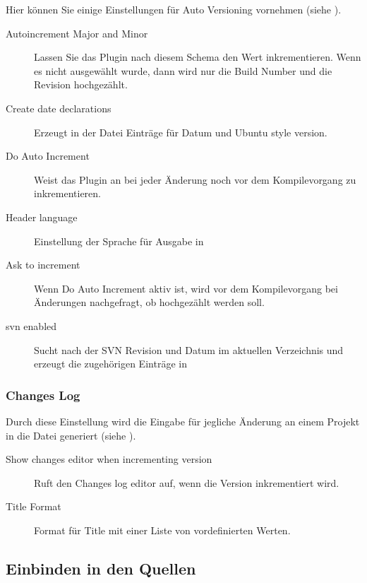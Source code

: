 Hier können Sie einige Einstellungen für Auto Versioning vornehmen (siehe ).


\begin{description}
\item[Autoincrement Major and Minor] Lassen Sie das Plugin nach diesem Schema den Wert inkrementieren. Wenn es nicht ausgewählt wurde, dann wird nur die Build Number und die Revision hochgezählt.
\item[Create date declarations] Erzeugt in der Datei  Einträge für Datum und Ubuntu style version.
\item[Do Auto Increment] Weist das Plugin an bei jeder Änderung noch vor dem Kompilevorgang zu inkrementieren.
\item[Header language] Einstellung der Sprache für Ausgabe in 
\item[Ask to increment] Wenn Do Auto Increment aktiv ist, wird vor dem Kompilevorgang bei Änderungen nachgefragt, ob hochgezählt werden soll.
\item[svn enabled] Sucht nach der SVN Revision und Datum im aktuellen Verzeichnis und erzeugt die zugehörigen Einträge in 
\end{description}

\subsubsection{Changes Log}

Durch diese Einstellung wird die Eingabe für jegliche Änderung an einem Projekt in die Datei  generiert (siehe ).


\begin{description}
\item[Show changes editor when incrementing version] Ruft den Changes log editor auf, wenn die Version inkrementiert wird.
\item[Title Format] Format für Title mit einer Liste von vordefinierten Werten.
\end{description}

\subsection{Einbinden in den Quellen}

